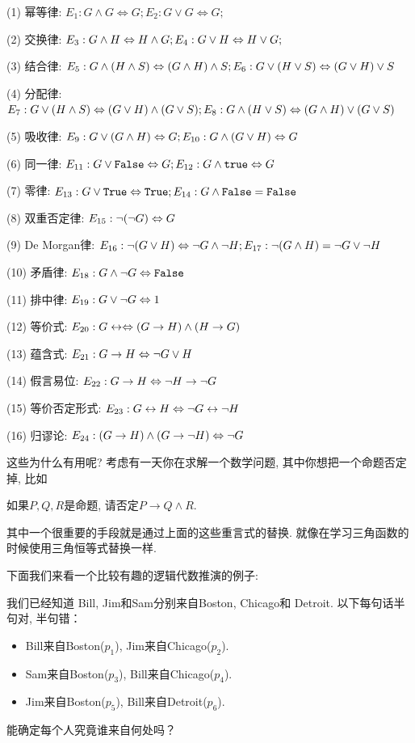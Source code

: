\begin{proposition}[基本等价定律]
	(1) 幂等律: $E_1:G\land G\Leftrightarrow G; E_2:G\lor G\Leftrightarrow G;$
	
	(2) 交换律: $E_3: G\land H \Leftrightarrow H \land G; E_4: G\lor H \Leftrightarrow H \lor G;$
	
	(3) 结合律: $E_5: G\land(H\land S)\Leftrightarrow (G\land H)\land S; E_6: G\lor(H\lor S)\Leftrightarrow (G\lor H)\lor S$
	
	(4) 分配律: $E_7: G\lor(H\land S) \Leftrightarrow (G\lor H)\land (G\lor S); E_8: G\land (H\lor S)\Leftrightarrow (G\land H)\lor (G\lor S)$
	
	(5) 吸收律: $E_9: G\lor (G\land H)\Leftrightarrow G; E_{10}: G\land (G\lor H)\Leftrightarrow G$
	
	(6) 同一律: $E_{11}: G\lor \texttt{False}\Leftrightarrow G; E_{12}: G\land \texttt{true}\Leftrightarrow G$
	
	(7) 零律: $E_{13}: G\lor \texttt{True}\Leftrightarrow \texttt{True}; E_{14}: G\land \texttt{False}=\texttt{False}$
	
	(8) 双重否定律: $E_{15}: \lnot (\lnot G)\Leftrightarrow G$
	
	(9) De Morgan律: $E_{16}: \lnot (G\lor H)\Leftrightarrow \lnot G \land \lnot H; E_{17}: \lnot (G\land H)=\lnot G\lor \lnot H$
	
	(10) 矛盾律: $E_{18}:G\land \lnot G\Leftrightarrow \texttt{False}$
	
	(11) 排中律: $E_{19}:G\lor \lnot G\Leftrightarrow 1$
	
	(12) 等价式: $E_{20}:G\leftrightarrow \Leftrightarrow (G\to H)\land (H\to G)$
	
	(13) 蕴含式: $E_{21}: G\to H\Leftrightarrow \lnot G\lor H$
	
	(14) 假言易位: $E_{22}: G\to H \Leftrightarrow \lnot H\to \lnot G$
	
	(15) 等价否定形式: $E_{23}: G\leftrightarrow H \Leftrightarrow \lnot G\leftrightarrow \lnot H$
	
	(16) 归谬论: $E_{24}: (G\to H)\land (G\to \lnot H) \Leftrightarrow \lnot G$
	
\end{proposition}

这些为什么有用呢? 考虑有一天你在求解一个数学问题, 其中你想把一个命题否定掉, 比如

\begin{prob}
	如果$P,Q,R$是命题, 请否定$P\to Q\land R$. 
\end{prob}

其中一个很重要的手段就是通过上面的这些重言式的替换. 就像在学习三角函数的时候使用三角恒等式替换一样. 

下面我们来看一个比较有趣的逻辑代数推演的例子: 
\begin{prob}
	我们已经知道 Bill, Jim和Sam分别来自Boston, Chicago和 Detroit. 以下每句话半句对, 半句错：
	\begin{itemize}
		\item Bill来自Boston($p_1$), Jim来自Chicago($p_2$).
		\item Sam来自Boston($p_3$), Bill来自Chicago($p_4$).
		\item Jim来自Boston($p_5$), Bill来自Detroit($p_6$).
	\end{itemize}
	能确定每个人究竟谁来自何处吗？
\end{prob}

